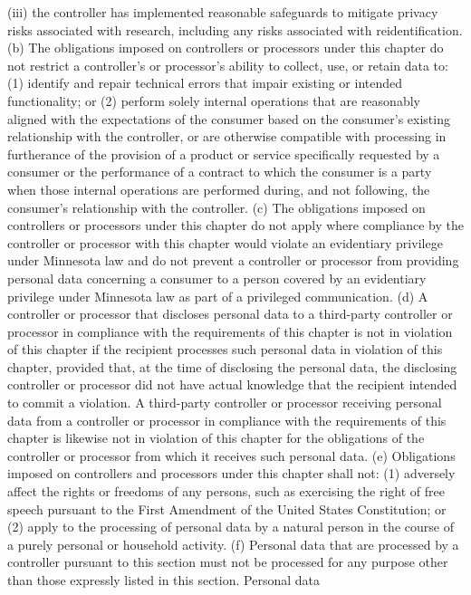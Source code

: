 (iii) the controller has implemented reasonable safeguards to mitigate privacy risks
associated with research, including any risks associated with reidentification.
(b) The obligations imposed on controllers or processors under this chapter do not restrict
a controller's or processor's ability to collect, use, or retain data to:
(1) identify and repair technical errors that impair existing or intended functionality; or
(2) perform solely internal operations that are reasonably aligned with the expectations
of the consumer based on the consumer's existing relationship with the controller, or are
otherwise compatible with processing in furtherance of the provision of a product or service
specifically requested by a consumer or the performance of a contract to which the consumer
is a party when those internal operations are performed during, and not following, the
consumer's relationship with the controller.
(c) The obligations imposed on controllers or processors under this chapter do not apply
where compliance by the controller or processor with this chapter would violate an
evidentiary privilege under Minnesota law and do not prevent a controller or processor from
providing personal data concerning a consumer to a person covered by an evidentiary
privilege under Minnesota law as part of a privileged communication.
(d) A controller or processor that discloses personal data to a third-party controller or
processor in compliance with the requirements of this chapter is not in violation of this
chapter if the recipient processes such personal data in violation of this chapter, provided
that, at the time of disclosing the personal data, the disclosing controller or processor did
not have actual knowledge that the recipient intended to commit a violation. A third-party
controller or processor receiving personal data from a controller or processor in compliance
with the requirements of this chapter is likewise not in violation of this chapter for the
obligations of the controller or processor from which it receives such personal data.
(e) Obligations imposed on controllers and processors under this chapter shall not:
(1) adversely affect the rights or freedoms of any persons, such as exercising the right
of free speech pursuant to the First Amendment of the United States Constitution; or
(2) apply to the processing of personal data by a natural person in the course of a purely
personal or household activity.
(f) Personal data that are processed by a controller pursuant to this section must not be
processed for any purpose other than those expressly listed in this section. Personal data
